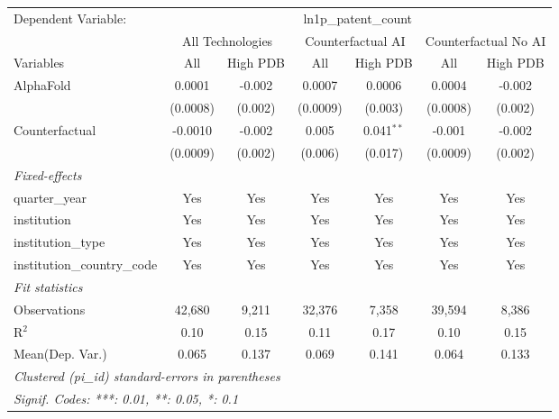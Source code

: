 \begingroup
\centering
\begin{tabular}{lcccccc}
   \tabularnewline \midrule \midrule
   Dependent Variable: & \multicolumn{6}{c}{ln1p\_patent\_count}\\
 & \multicolumn{2}{c}{All Technologies} & \multicolumn{2}{c}{Counterfactual AI} & \multicolumn{2}{c}{Counterfactual No AI} \\
\cmidrule(lr){1-1}\cmidrule(lr){2-3} \cmidrule(lr){4-5} \cmidrule(lr){6-7}
Variables & \multicolumn{1}{c}{All} & \multicolumn{1}{c}{High PDB} & \multicolumn{1}{c}{All} & \multicolumn{1}{c}{High PDB} & \multicolumn{1}{c}{All} & \multicolumn{1}{c}{High PDB} \\
\cmidrule(lr){1-1}\cmidrule(lr){2-2} \cmidrule(lr){3-3} \cmidrule(lr){4-4} \cmidrule(lr){5-5} \cmidrule(lr){6-6} \cmidrule(lr){7-7}
   AlphaFold                    & 0.0001   & -0.002  & 0.0007   & 0.0006       & 0.0004   & -0.002\\   
                                & (0.0008) & (0.002) & (0.0009) & (0.003)      & (0.0008) & (0.002)\\   
   Counterfactual               & -0.0010  & -0.002  & 0.005    & 0.041$^{**}$ & -0.001   & -0.002\\   
                                & (0.0009) & (0.002) & (0.006)  & (0.017)      & (0.0009) & (0.002)\\   
   \midrule
   \emph{Fixed-effects}\\
   quarter\_year                & Yes      & Yes     & Yes      & Yes          & Yes      & Yes\\  
   institution                  & Yes      & Yes     & Yes      & Yes          & Yes      & Yes\\  
   institution\_type            & Yes      & Yes     & Yes      & Yes          & Yes      & Yes\\  
   institution\_country\_code   & Yes      & Yes     & Yes      & Yes          & Yes      & Yes\\  
   \midrule
   \emph{Fit statistics}\\
   Observations                 & 42,680   & 9,211   & 32,376   & 7,358        & 39,594   & 8,386\\  
   R$^2$                        & 0.10     & 0.15    & 0.11     & 0.17         & 0.10     & 0.15\\  
Mean(Dep. Var.) & 0.065 & 0.137 & 0.069 & 0.141 & 0.064 & 0.133 \\
   \midrule \midrule
   \multicolumn{7}{l}{\emph{Clustered (pi\_id) standard-errors in parentheses}}\\
   \multicolumn{7}{l}{\emph{Signif. Codes: ***: 0.01, **: 0.05, *: 0.1}}\\
\end{tabular}
\par\endgroup
